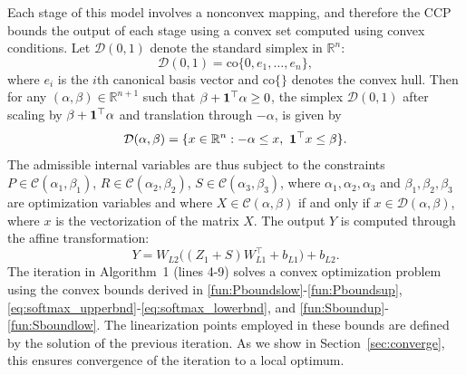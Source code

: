 \documentclass{ifacconf}
\begin{document}
Each stage of this model involves a nonconvex mapping, and therefore the CCP bounds the output of each stage using a
convex set computed using convex conditions. 
%
Let $\mathcal{D}(0,1)$ denote the standard simplex in $\mathbb{R}^n$:
\[
  \mathcal{D}(0,1)
  =
  \mathrm{co} \{ 0, e_1, \dots, e_n \},
\]
where $e_i$ is the $i$th canonical basis vector and $\mathrm{co}\{\}$ denotes the convex hull.
Then for any $(\alpha,\beta)\in \mathbb{R}^{n+1}$ such that $\beta + {\bf 1}^\top\alpha \geq 0$, the simplex $\mathcal{D}(0,1)$ after scaling by $\beta+{\bf 1}^\top \alpha$ and translation through $-\alpha$, is given by
\[
\mathcal{D}(\alpha,\beta) = \{ x\in \mathbb{R}^n : -\alpha \leq x, \ {\bf 1}^\top x \leq \beta\} .
\]
The admissible internal variables are thus subject to the constraints
$P\in\mathcal{C}(\alpha_1,\beta_1)$,
$R\in\mathcal{C}(\alpha_2,\beta_2)$, 
$S\in\mathcal{C}(\alpha_3,\beta_3)$,
where $\alpha_1,\alpha_2,\alpha_3$ and $\beta_1,\beta_2,\beta_3$ are optimization variables
%
and where $X\in \mathcal{C}(\alpha,\beta)$ if and only if $x\in \mathcal{D}(\alpha,\beta)$, where $x$ is the vectorization of the matrix $X$.
%
The output $Y$ is computed
through the affine transformation:
\[
  Y = W_{L2} \bigl((Z_1 + S)W_{L1}^\top + b_{L1}\bigr) + b_{L2} .
\]
The iteration in Algorithm~1 (lines 4-9) solves a convex optimization problem using the convex bounds derived in \eqref{fun:Pboundslow}-\eqref{fun:Pboundsup}, \eqref{eq:softmax_upperbnd}-\eqref{eq:softmax_lowerbnd}, and \eqref{fun:Sboundup}-\eqref{fun:Sboundlow}. The linearization points employed in these bounds are defined by the solution of the previous iteration. As we show in Section~\ref{sec:converge}, this ensures convergence of the iteration to a local optimum.
\end{document}

